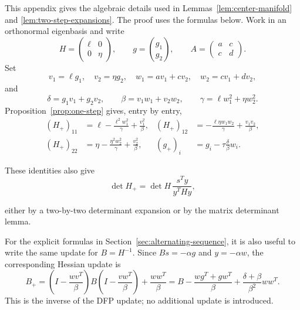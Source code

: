 \documentclass[11pt]{article}
\begin{document}
This appendix gives the algebraic details used in
Lemmas~\ref{lem:center-manifold} and \ref{lem:two-step-expansions}.  The proof
uses the formulas below.  Work in an orthonormal eigenbasis and write
\[
H=\begin{pmatrix}\ell&0\\0&\eta\end{pmatrix},\qquad
g=\binom{g_1}{g_2},\qquad
A=\begin{pmatrix}a&c\\c&d\end{pmatrix}.
\]
Set
\[
v_1=\ell g_1,\quad v_2=\eta g_2,\quad
w_1=av_1+cv_2,\quad w_2=cv_1+dv_2,
\]
and
\[
\delta=g_1v_1+g_2v_2,\qquad
\beta=v_1w_1+v_2w_2,
\qquad \gamma=\ell w_1^2+\eta w_2^2.
\]
Proposition~\ref{prop:one-step} gives, entry by entry,
\begin{align}
(H_+)_{11}&=\ell-\frac{\ell^2w_1^2}{\gamma}
                    +\frac{v_1^2}{\beta},
&
(H_+)_{12}&=-\frac{\ell\eta w_1w_2}{\gamma}
                    +\frac{v_1v_2}{\beta},
\label{eq:appendix-H-entries}\\
(H_+)_{22}&=\eta-\frac{\eta^2w_2^2}{\gamma}
                    +\frac{v_2^2}{\beta},
&
(g_+)_i&=g_i-\tau\frac{\delta}{\beta}w_i.
\nonumber
\end{align}

These identities also give
\begin{equation}\label{eq:dfp-determinant}
\det H_+=\det H\,\frac{s^Ty}{y^THy},
\end{equation}

either by a two-by-two determinant expansion or by the matrix determinant
lemma.

For the explicit formulas in Section~\ref{sec:alternating-sequence}, it is
also useful to write the same update for $B=H^{-1}$.  Since
$Bs=-\alpha g$ and $y=-\alpha w$, the corresponding Hessian update is
\begin{equation}\label{eq:appendix-B-update}
B_+
=\left(I-\frac{wv^T}{\beta}\right)
B\left(I-\frac{vw^T}{\beta}\right)
+\frac{ww^T}{\beta}
=B-\frac{wg^T+gw^T}{\beta}
+\frac{\delta+\beta}{\beta^2}ww^T.
\end{equation}
This is the inverse of the DFP update; no additional update is introduced.
\end{document}
